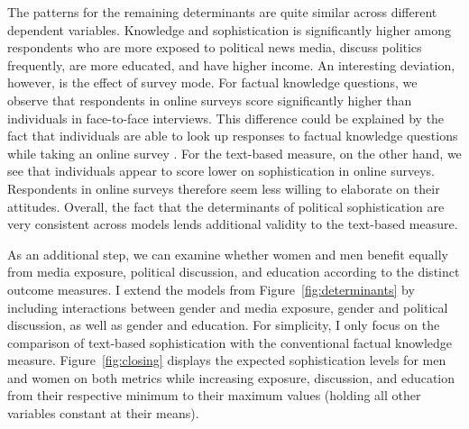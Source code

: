 \documentclass[12pt]{article}
\begin{document}
The patterns for the remaining determinants are quite similar across different dependent variables. Knowledge and sophistication is significantly higher among respondents who are more exposed to political news media, discuss politics frequently, are more educated, and have higher income. An interesting deviation, however, is the effect of survey mode. For factual knowledge questions, we observe that respondents in online surveys score significantly higher than individuals in face-to-face interviews. This difference could be explained by the fact that individuals are able to look up responses to factual knowledge questions while taking an online survey \citep[see also][]{clifford2016cheating}. For the text-based measure, on the other hand, we see that individuals appear to score lower on sophistication in online surveys. Respondents in online surveys therefore seem less willing to elaborate on their attitudes. Overall, the fact that the determinants of political sophistication are very consistent across models lends additional validity to the text-based measure.

As an additional step, we can examine whether women and men benefit equally from media exposure, political discussion, and education according to the distinct outcome measures. I extend the models from Figure~\ref{fig:determinants} by including interactions between gender and media exposure, gender and political discussion, as well as gender and education. For simplicity, I only focus on the comparison of text-based sophistication with the conventional factual knowledge measure. Figure~\ref{fig:closing} displays the expected sophistication levels for men and women on both metrics while increasing exposure, discussion, and education from their respective minimum to their maximum values (holding all other variables constant at their means).
\end{document}
